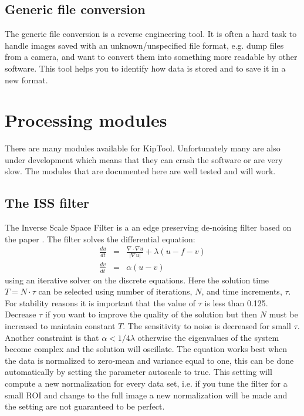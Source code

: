 \documentclass[a4paper]{scrreprt}
\begin{document}
\subsection{Generic file conversion}
The generic file conversion is a reverse engineering tool. It is often a hard task to handle  images saved with an unknown/unspecified file format, e.g. dump files from a camera, and want to convert them into something more readable by other software. This tool helps you to identify how data is stored and to save it in a new format.

\section{Processing modules}
There are many modules available for KipTool. Unfortunately many are also under development which means that they can crash the software or are very slow. The modules that are documented here are well tested and will work.
\subsection{The ISS filter}
The Inverse Scale Space Filter is a an edge preserving de-noising filter based on the paper \cite{burger2006}. The filter solves the differential equation:
\begin{eqnarray}
\frac{du}{dt}&=&\frac{\nabla\cdot \nabla u}{|\nabla u|} + \lambda(u-f-v)\nonumber\\
\frac{dv}{dt}&=&\alpha (u-v)
\end{eqnarray}
using an iterative solver on the discrete equations. Here the solution time $T=N\cdot\tau$ can be selected using number of iterations, $N$, and time increments, $\tau$. For stability reasons it is important that the value of $\tau$ is less than 0.125. Decrease $\tau$ if you want to improve the quality of the solution but then $N$ must be increased to maintain constant $T$. The sensitivity to noise is decreased for small $\tau$. Another constraint is that $\alpha<1/4 \lambda$ otherwise the eigenvalues of the system become complex and the solution will oscillate. The equation works best when the data is normalized to zero-mean and variance equal to one, this can be done automatically by setting the parameter autoscale to true. This setting will compute a new normalization for every data set, i.e. if you tune the filter for a small ROI and change to the full image a new normalization will be made and the setting are not guaranteed to be perfect. 
\end{document}
